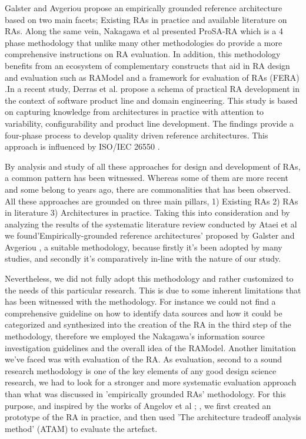 \documentclass[review]{elsarticle}
\begin{document}
Galster and Avgeriou \cite{galster2011empirically} propose an empirically grounded reference architecture based on two main facets; Existing RAs in practice and available literature on RAs. Along the same vein, Nakagawa et al \cite{nakagawa2014consolidating} presented ProSA-RA which is a 4 phase methodology that unlike many other methodologies do provide a more comprehensive instructions on RA evaluation. In addition, this methodology benefits from an ecosystem of complementary constructs that aid in RA design and evaluation such as RAModel \cite{nakagawa2012ramodel} and a framework for evaluation of RAs (FERA) \cite{santos2013checklist}.In a recent study, Derras et al. \cite{derras2018reference} propose a schema of practical RA development in the context of software product line and domain engineering. This study is based on capturing knowledge from architectures in practice with attention to variability, configurability and product line development. The findings provide a four-phase process to develop quality driven reference architectures. This approach is influenced by ISO/IEC 26550 \cite{wg2015iso}.

By analysis and study of all these approaches for design and development of RAs, a common pattern has been witnessed. Whereas some of them are more recent and some belong to years ago, there are commonalities that has been observed. All these approaches are grounded on three main pillars, 1) Existing RAs 2) RAs in literature 3) Architectures in practice. Taking this into consideration and by analyzing the results of the systematic literature review conducted by Ataei et al \cite{AtaeiACIS} we found'Empirically-grounded reference architectures' proposed by Galster and Avgeriou \cite{galster2011empirically}, a suitable methodology, because firstly it's been adopted by many studies, and secondly it's comparatively in-line with the nature of our study. 

Nevertheless, we did not fully adopt this methodology and rather customized to the needs of this particular research. This is due to some inherent limitations that has been witnessed with the methodology. For instance we could not find a comprehensive guideline on how to identify data sources and how it could be categorized and synthesized into the creation of the RA in the third step of the methodology, therefore we employed the Nakagawa's information source investigation guidelines and the overall idea of the RAModel. Another limitation we've faced was with evaluation of the RA. As evaluation, second to a sound research methodology is one of the key elements of any good design science research, we had to look for a stronger and more systematic evaluation approach than what was discussed in 'empirically grounded RAs' methodology. For this purpose, and inspired by the works of Angelov et al \cite{angelov2008towards}; \cite{angelov2014extending}, we first created an prototype of the RA in practice, and then used 'The architecture tradeoff analysis method' (ATAM) \cite{kazman1998architecture} to evaluate the artefact.
\end{document}

